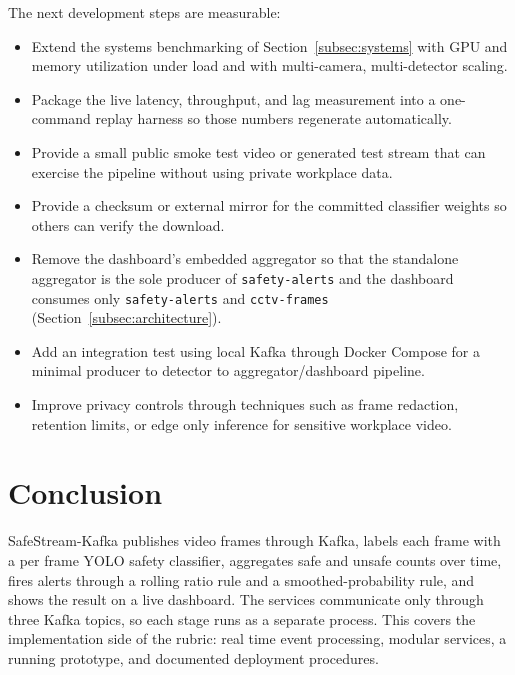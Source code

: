 \documentclass[conference]{IEEEtran}
\begin{document}
The next development steps are measurable:

\begin{itemize}
    \item Extend the systems benchmarking of Section~\ref{subsec:systems} with
    GPU and memory utilization under load and with multi-camera, multi-detector
    scaling.

    \item Package the live latency, throughput, and lag measurement into a
    one-command replay harness so those numbers regenerate automatically.

    \item Provide a small public smoke test video or generated test
    stream that can exercise the pipeline without using private
    workplace data.

    \item Provide a checksum or external mirror for the committed classifier
    weights so others can verify the download.

    \item Remove the dashboard's embedded aggregator so that the standalone
    aggregator is the sole producer of \texttt{safety-alerts} and the dashboard
    consumes only \texttt{safety-alerts} and \texttt{cctv-frames}
    (Section~\ref{subsec:architecture}).

    \item Add an integration test using local Kafka through Docker
    Compose for a minimal producer to detector to aggregator/dashboard
    pipeline.

    \item Improve privacy controls through techniques such as frame
    redaction, retention limits, or edge only inference for sensitive
    workplace video.
\end{itemize}


\section{Conclusion}

SafeStream-Kafka publishes video frames through Kafka, labels each frame
with a per frame YOLO safety classifier, aggregates safe and unsafe counts
over time, fires alerts through a rolling ratio rule and a
smoothed-probability rule, and shows the result on a live dashboard. The
services communicate only through three Kafka topics, so each stage runs
as a separate process. This covers the implementation side of the rubric:
real time event processing, modular services, a running prototype, and
documented deployment procedures.
\end{document}
